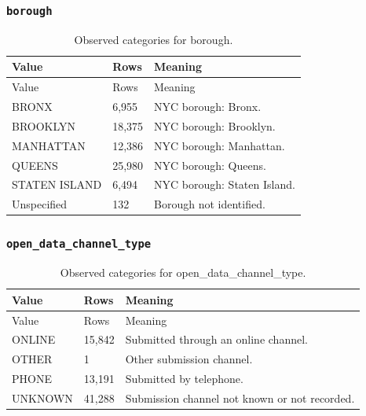 \subsubsection*{\texttt{borough}}
\begin{longtable}{@{}p{.32\linewidth}p{.09\linewidth}p{.53\linewidth}@{}}
\caption{Observed categories for borough.}\\
\toprule Value & Rows & Meaning\\\midrule\endfirsthead
\toprule Value & Rows & Meaning\\\midrule\endhead
\bottomrule\endfoot
BRONX & 6,955 & NYC borough: Bronx.\\
BROOKLYN & 18,375 & NYC borough: Brooklyn.\\
MANHATTAN & 12,386 & NYC borough: Manhattan.\\
QUEENS & 25,980 & NYC borough: Queens.\\
STATEN ISLAND & 6,494 & NYC borough: Staten Island.\\
Unspecified & 132 & Borough not identified.\\
\end{longtable}
\subsubsection*{\texttt{open\_\allowbreak{}data\_\allowbreak{}channel\_\allowbreak{}type}}
\begin{longtable}{@{}p{.32\linewidth}p{.09\linewidth}p{.53\linewidth}@{}}
\caption{Observed categories for open\_data\_channel\_type.}\\
\toprule Value & Rows & Meaning\\\midrule\endfirsthead
\toprule Value & Rows & Meaning\\\midrule\endhead
\bottomrule\endfoot
ONLINE & 15,842 & Submitted through an online channel.\\
OTHER & 1 & Other submission channel.\\
PHONE & 13,191 & Submitted by telephone.\\
UNKNOWN & 41,288 & Submission channel not known or not recorded.\\
\end{longtable}
